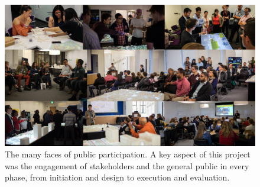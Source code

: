 {{        \begin{figure}[!htb]
            \begin{center}
                \includegraphics[width=1\textwidth]{chapters/consensus/BRT/figures/brt8.jpeg}
            \end{center}
            \caption{The many faces of public participation. A key aspect of this project was the engagement of stakeholders and the general public in every phase, from initiation and design to execution and evaluation.}
            \label{fig:brt_public_grid}
        \end{figure}

}}
